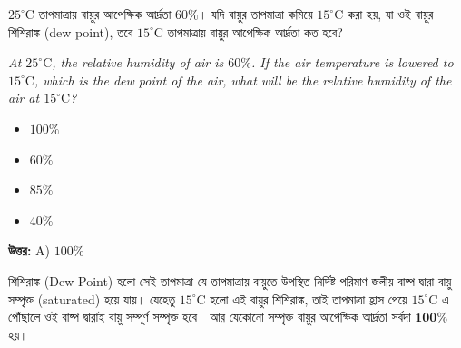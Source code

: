 \documentclass[12pt, a4paper]{article}
\begin{document}
\vspace{2em}

\begin{tcolorbox}[questionbox={প্রশ্ন (Question) 23}]
    \noindent
    $25^\circ\text{C}$ তাপমাত্রায় বায়ুর আপেক্ষিক আর্দ্রতা $60\%$। যদি বায়ুর তাপমাত্রা কমিয়ে $15^\circ\text{C}$ করা হয়, যা ওই বায়ুর শিশিরাঙ্ক (dew point), তবে $15^\circ\text{C}$ তাপমাত্রায় বায়ুর আপেক্ষিক আর্দ্রতা কত হবে?
    
    \vspace{0.8em}
    \begin{english}
    \noindent\textit{\color{darkgray}
    At $25^\circ\text{C}$, the relative humidity of air is $60\%$. If the air temperature is lowered to $15^\circ\text{C}$, which is the dew point of the air, what will be the relative humidity of the air at $15^\circ\text{C}$?
    }
    \end{english}
\end{tcolorbox}

\begin{itemize}[label={}, leftmargin=1cm, itemsep=0.5em]
    \item[\textbf{A)}] $100\%$
    \item[\textbf{B)}] $60\%$
    \item[\textbf{C)}] $85\%$
    \item[\textbf{D)}] $40\%$
\end{itemize}

\vspace{0.5em}
\begin{tcolorbox}[answerbox]
    \textbf{\color{success} উত্তর:} A) $100\%$
\end{tcolorbox}
\vspace{1em}

\begin{tcolorbox}[solutionbox={সমাধান (Solution)}]
    \noindent
    শিশিরাঙ্ক (Dew Point) হলো সেই তাপমাত্রা যে তাপমাত্রায় বায়ুতে উপস্থিত নির্দিষ্ট পরিমাণ জলীয় বাষ্প দ্বারা বায়ু সম্পৃক্ত (saturated) হয়ে যায়। যেহেতু $15^\circ\text{C}$ হলো এই বায়ুর শিশিরাঙ্ক, তাই তাপমাত্রা হ্রাস পেয়ে $15^\circ\text{C}$ এ পৌঁছালে ওই বাষ্প দ্বারাই বায়ু সম্পূর্ণ সম্পৃক্ত হবে। আর যেকোনো সম্পৃক্ত বায়ুর আপেক্ষিক আর্দ্রতা সর্বদা $\mathbf{100\%}$ হয়।
\end{tcolorbox}

\vspace{2em}
\end{document}
